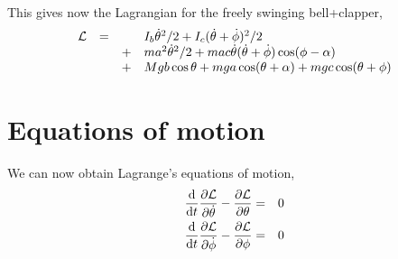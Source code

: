\documentclass{article}
\begin{document}
This gives now the Lagrangian for the freely swinging bell+clapper,
\begin{equation}
\begin{array}{rccl}
\cal{L} &=& & I_b \dot{\theta}^2/2 + I_c (\dot{\theta}+\dot{\phi})^2/2 \\
& & + & m a^2 \dot{\theta}^2/2
       + mac \dot{\theta} (\dot{\theta} + \dot{\phi}) \cos(\phi - \alpha) \\
& & + & Mgb \cos \theta + mga \cos(\theta+\alpha) + mgc \cos(\theta + \phi)
\end{array}
\end{equation}

\section{Equations of motion}

We can now obtain Lagrange's equations of motion,
\begin{eqnarray}
\frac{\mathrm{d} }{\mathrm{d} t} \frac{\partial \cal{L}}{\partial \dot{\theta}} - \frac{\partial \cal{L}}{\partial \theta} &=& 0 \\
\frac{\mathrm{d} }{\mathrm{d} t} \frac{\partial \cal{L}}{\partial \dot{\phi}} - \frac{\partial \cal{L}}{\partial \phi} &=& 0
\end{eqnarray}
\end{document}
